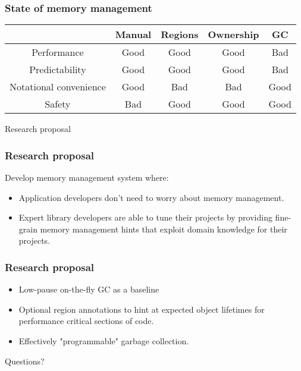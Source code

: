 \begin{frame}
    \frametitle{State of memory management}
    \newcommand{\Best}{{\color{seagreen} Good}}
    \newcommand{\Worst}{{\color{alizarin} Bad}}
    \begin{center}
        \begin{tabular}{c | c | c | c | c}
                                   & Manual & Regions & Ownership & GC     \\
                                   \hline
            Performance            & \Best  & \Best   & \Best     & \Worst \\
            Predictability         & \Best  & \Best   & \Best     & \Worst \\
            Notational convenience & \Best  & \Worst  & \Worst    & \Best  \\
            Safety                 & \Worst & \Best   & \Best     & \Best

        \end{tabular}
    \end{center}
\end{frame}

\begin{frame}
    \begin{center}
        {\LARGE Research proposal}
    \end{center}
\end{frame}

\begin{frame}
    \frametitle{Research proposal}
    Develop memory management system where:
    \begin{itemize}
        \item
            Application developers don't need to worry about memory
            management.
        \item
            Expert library developers are able to tune their projects
            by providing fine-grain memory management hints that
            exploit domain knowledge for their projects.
    \end{itemize}
\end{frame}


\begin{frame}
    \frametitle{Research proposal}
    \begin{itemize}
        \item
            Low-pause on-the-fly GC as a baseline
        \item
            Optional region annotations to hint at
            expected object lifetimes for performance
            critical sections of code.
        \item
            Effectively "programmable" garbage collection.
    \end{itemize}
\end{frame}

\begin{frame}
    \begin{center}
        {\LARGE Questions?} \\
    \end{center}
\end{frame}
